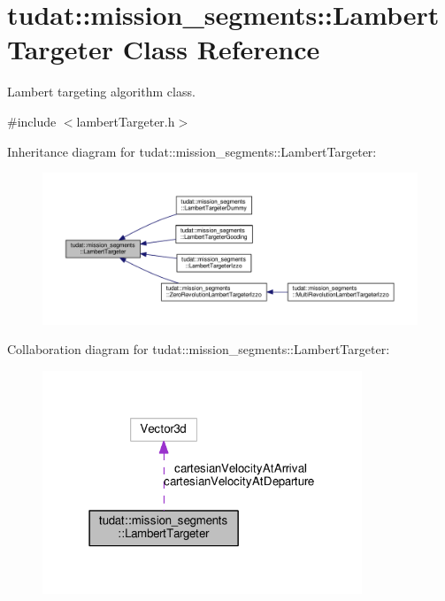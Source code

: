 \hypertarget{classtudat_1_1mission__segments_1_1LambertTargeter}{}\section{tudat\+:\+:mission\+\_\+segments\+:\+:Lambert\+Targeter Class Reference}
\label{classtudat_1_1mission__segments_1_1LambertTargeter}


Lambert targeting algorithm class.  




{\ttfamily \#include $<$lambert\+Targeter.\+h$>$}



Inheritance diagram for tudat\+:\+:mission\+\_\+segments\+:\+:Lambert\+Targeter\+:
\nopagebreak
\begin{figure}[H]
\begin{center}
\leavevmode
\includegraphics[width=350pt]{classtudat_1_1mission__segments_1_1LambertTargeter__inherit__graph}
\end{center}
\end{figure}


Collaboration diagram for tudat\+:\+:mission\+\_\+segments\+:\+:Lambert\+Targeter\+:
\nopagebreak
\begin{figure}[H]
\begin{center}
\leavevmode
\includegraphics[width=271pt]{classtudat_1_1mission__segments_1_1LambertTargeter__coll__graph}
\end{center}
\end{figure}
